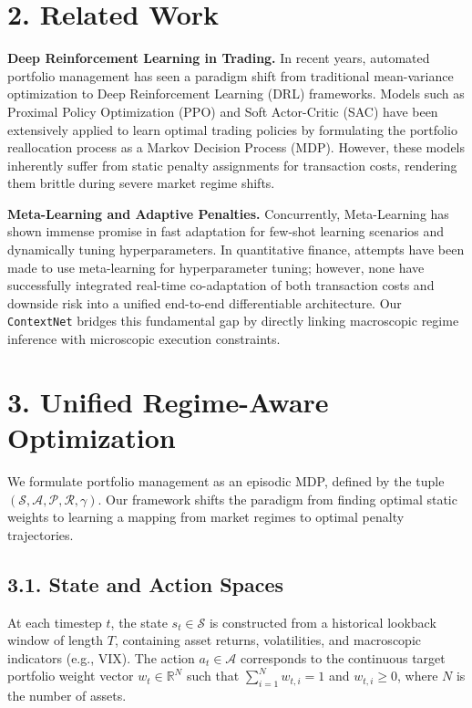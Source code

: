 \documentclass[letterpaper]{article} %
\begin{document}
\section{2. Related Work}
\textbf{Deep Reinforcement Learning in Trading.} In recent years, automated portfolio management has seen a paradigm shift from traditional mean-variance optimization \cite{sutton1998reinforcement} to Deep Reinforcement Learning (DRL) frameworks. Models such as Proximal Policy Optimization (PPO) and Soft Actor-Critic (SAC) have been extensively applied to learn optimal trading policies by formulating the portfolio reallocation process as a Markov Decision Process (MDP). However, these models inherently suffer from static penalty assignments for transaction costs, rendering them brittle during severe market regime shifts.

\textbf{Meta-Learning and Adaptive Penalties.} Concurrently, Meta-Learning \cite{finn2017model} has shown immense promise in fast adaptation for few-shot learning scenarios and dynamically tuning hyperparameters. In quantitative finance, attempts have been made to use meta-learning for hyperparameter tuning; however, none have successfully integrated real-time co-adaptation of both transaction costs and downside risk into a unified end-to-end differentiable architecture. Our \texttt{ContextNet} bridges this fundamental gap by directly linking macroscopic regime inference with microscopic execution constraints.

\section{3. Unified Regime-Aware Optimization}
We formulate portfolio management as an episodic MDP, defined by the tuple $(\mathcal{S}, \mathcal{A}, \mathcal{P}, \mathcal{R}, \gamma)$. Our framework shifts the paradigm from finding optimal static weights to learning a mapping from market regimes to optimal penalty trajectories.

\subsection{3.1. State and Action Spaces}
At each timestep $t$, the state $s_t \in \mathcal{S}$ is constructed from a historical lookback window of length $T$, containing asset returns, volatilities, and macroscopic indicators (e.g., VIX). The action $a_t \in \mathcal{A}$ corresponds to the continuous target portfolio weight vector $w_t \in \mathbb{R}^N$ such that $\sum_{i=1}^N w_{t,i} = 1$ and $w_{t,i} \geq 0$, where $N$ is the number of assets.
\end{document}
